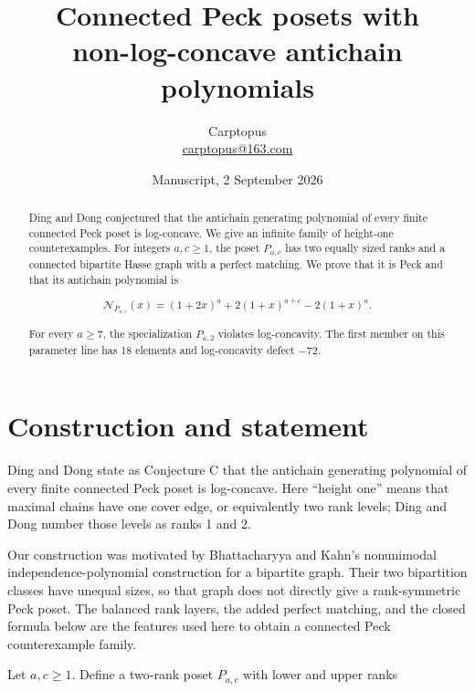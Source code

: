 \documentclass[11pt]{article}
\title{Connected Peck posets with\\non-log-concave antichain polynomials}
\author{Carptopus\\\href{mailto:carptopus@163.com}{carptopus@163.com}}
\date{Manuscript, 2 September 2026}
\numberwithin{equation}{section}
\begin{document}
\maketitle

\begin{center}
\end{center}

\begin{abstract}


Ding and Dong conjectured that the antichain generating polynomial of every finite connected Peck
poset is log-concave. We give an infinite family of height-one counterexamples. For integers
$a,c\geq 1$, the poset $P_{a,c}$ has two equally sized ranks and a connected bipartite Hasse graph
with a perfect matching. We prove that it is Peck and that its antichain polynomial is

\[
\mathcal N_{P_{a,c}}(x)=(1+2x)^a+2(1+x)^{a+c}-2(1+x)^a.
\]

For every $a\geq 7$, the specialization $P_{a,2}$ violates log-concavity. The first member on this
parameter line has 18 elements and log-concavity defect $-72$.

\end{abstract}

\section{Construction and statement}


Ding and Dong state as Conjecture C that the antichain generating polynomial of every finite
connected Peck poset is log-concave. Here ``height one'' means that maximal chains have one cover
edge, or equivalently two rank levels; Ding and Dong number those levels as ranks 1 and 2.

Our construction was motivated by Bhattacharyya and Kahn's nonunimodal independence-polynomial
construction for a bipartite graph. Their two bipartition classes have unequal sizes, so that graph
does not directly give a rank-symmetric Peck poset. The balanced rank layers, the added perfect
matching, and the closed formula below are the features used here to obtain a connected Peck
counterexample family.

Let $a,c\geq 1$. Define a two-rank poset $P_{a,c}$ with lower and upper ranks
\end{document}
